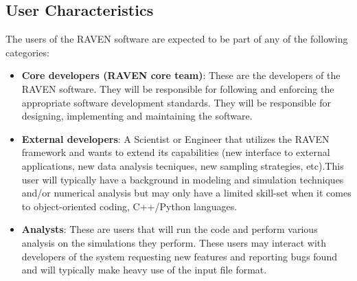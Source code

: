 \subsection{User Characteristics}

The users of the RAVEN software are expected to be part of any of the
following categories:
\begin{itemize}
  \item \textbf{Core developers (RAVEN core team)}: These are the developers of the RAVEN software. They will be responsible for following
    and enforcing the appropriate software development standards. They will be responsible for designing, implementing and 
    maintaining the software.
  \item \textbf{External developers}: A Scientist or Engineer that utilizes the RAVEN framework and wants to extend its capabilities (new interface to external
 applications, new data analysis tecniques, new sampling strategies, etc).This user will typically have a background in modeling and 
simulation techniques and/or numerical analysis but may only have a limited skill-set when it comes to object-oriented coding, C++/Python languages.
  \item \textbf{Analysts}:  These are users that will run the code and perform various analysis on the simulations they perform. These users may interact with developers of the system requesting new features and reporting bugs found and will typically make heavy use of the input file format.
\end{itemize}
